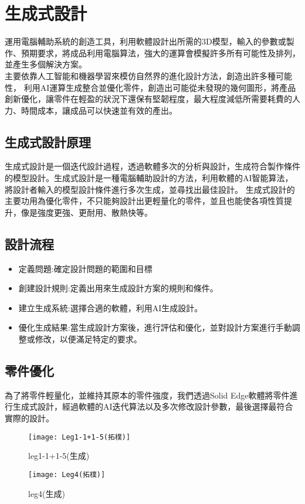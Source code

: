 \chapter{生成式設計}
運用電腦輔助系統的創造工具，利用軟體設計出所需的3D模型，輸入的參數或製作、預期要求，將成品利用電腦算法，強大的運算會模擬許多所有可能性及排列，並產生多個解決方案。\\
主要依靠人工智能和機器學習來模仿自然界的進化設計方法，創造出許多種可能性，
利用AI運算生成整合並優化零件，創造出可能從未發現的幾何圖形，將產品創新優化，讓零件在輕盈的狀況下還保有堅韌程度，最大程度減低所需要耗費的人力、時間成本，讓成品可以快速並有效的產出。\\

\section{生成式設計原理}
生成式設計是一個迭代設計過程，透過軟體多次的分析與設計，生成符合製作條件的模型設計。生成式設計是一種電腦輔助設計的方法，利用軟體的AI智能算法，將設計者輸入的模型設計條件進行多次生成，並尋找出最佳設計。
生成式設計的主要功用為優化零件，不只能夠設計出更輕量化的零件，並且也能使各項性質提升，像是強度更強、更耐用、散熱快等。\

\section{設計流程}
\begin{itemize}
\item 定義問題:確定設計問題的範圍和目標
\item 創建設計規則:定義出用來生成設計方案的規則和條件。
\item	建立生成系統:選擇合適的軟體，利用AI生成設計。
\item 優化生成結果:當生成設計方案後，進行評估和優化，並對設計方案進行手動調整或修改，以便滿足特定的要求。
\end{itemize}

\section{零件優化}
為了將零件輕量化，並維持其原本的零件強度，我們透過Solid Edge軟體將零件進行生成式設計，經過軟體的AI迭代算法以及多次修改設計參數，最後選擇最符合實際的設計。\

\begin{figure}[htbp]
  \begin{minipage}[t]{1.2\linewidth}
    \centering
    \texttt{[image: Leg1-1+1-5(拓樸)]}
    \caption{leg1-1+1-5(生成)}
    \label{Leg1-1+1-5(拓樸)}
  \end{minipage}
  \hfill
  \begin{minipage}[t]{1.2\linewidth}
    \centering
    \texttt{[image: Leg4(拓樸)]}
    \caption{leg4(生成)}
    \label{Leg4(拓樸)}
  \end{minipage}
\end{figure}

